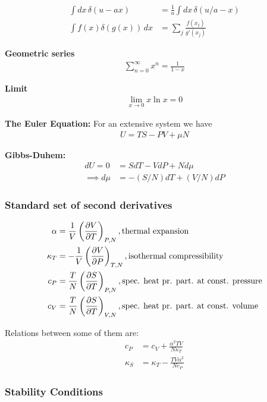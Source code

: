 \documentclass[a4paper, english, 12pt]{article}
\begin{document}
\begin{multicols*}{2}
\begin{align*}
    \int dx\,\delta(u-ax) &= \frac{1}{a}\int dx\,\delta(u/a - x) \\ 
    \int f(x)\delta(g(x))\,dx &= \sum_j \frac{f(x_j)}{g'(x_j)}
\end{align*}

\textbf{Geometric series}
\begin{align*}
    \sum_{n=0}^\infty x^n = \frac{1}{1-x}
\end{align*}

\textbf{Limit}
\begin{align*}
    \lim_{x\to0} x\ln x = 0
\end{align*}

\textbf{The Euler Equation:}
For an extensive system we have 
\begin{align*}
    U=TS-PV+\mu N
\end{align*}

\textbf{Gibbs-Duhem:}
\begin{align*}
    dU=0 &= SdT-VdP+Nd\mu \\ 
    \implies d\mu &= -(S/N)dT+(V/N)dP  
\end{align*}


\subsubsection*{\scriptsize Standard set of second derivatives}
\begin{align*}
    \alpha &= \frac{1}{V}\left(\pdv{V}{T} \right)_{P,N}, \text{thermal expansion} \\ 
    \kappa_T &= -\frac{1}{V}\left(\pdv{V}{P} \right)_{T,N}, \text{isothermal compressibility} \\ 
    c_P &= \frac{T}{N}\left(\pdv{S}{T} \right)_{P,N}, \text{spec. heat pr. part. at const. pressure} \\ 
    c_V &= \frac{T}{N}\left(\pdv{S}{T} \right)_{V,N}, \text{spec. heat pr. part. at const. volume}
\end{align*}

Relations between some of them are:
\begin{align*}
    c_P &= c_V + \frac{\alpha^2 TV}{N\kappa_T} \\ 
    \kappa_S &= \kappa_T - \frac{TV \alpha^2}{Nc_P}
\end{align*}


\subsubsection*{\scriptsize Stability Conditions}


\end{multicols*}
\end{document}
